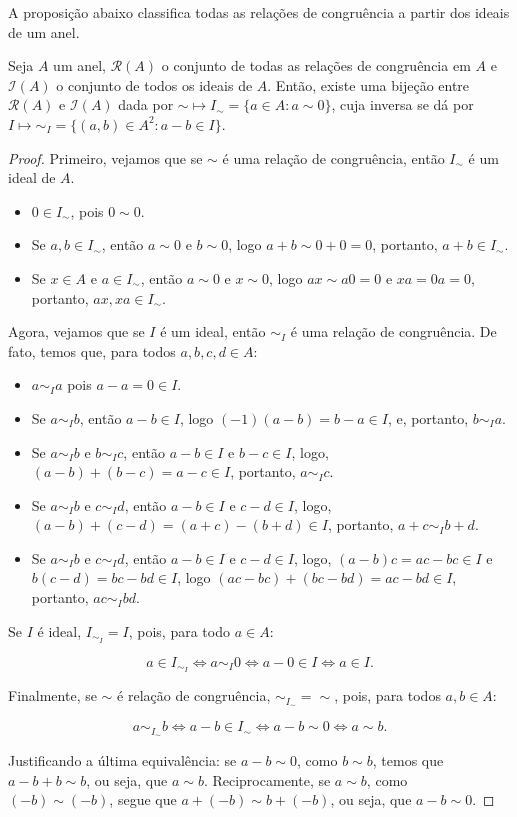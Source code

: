 A proposição abaixo classifica todas as relações de congruência a partir dos ideais de um anel.
\begin{prop}
    Seja $A$ um anel, $\mathcal R(A)$ o conjunto de todas as relações de congruência em $A$ e $\mathcal I(A)$ o conjunto de todos os ideais de $A$. Então, existe uma bijeção entre $\mathcal R(A)$ e $\mathcal I(A)$ dada por
    $\sim \mapsto I_{\sim}=\{a \in A: a\sim 0\}$,
    cuja inversa se dá por $I\mapsto \sim_I=\{(a, b) \in A^2: a-b \in I\}$.
\end{prop}
\begin{proof}
Primeiro, vejamos que se $\sim$ é uma relação de congruência, então $I_\sim$ é um ideal de $A$.

\begin{itemize}
\item $0 \in I_\sim$, pois $0\sim 0$.
\item Se $a, b \in I_\sim$, então $a\sim 0$ e $b\sim 0$, logo $a+b\sim 0+0=0$, portanto, $a+b \in I_\sim$.
\item Se $x \in A$ e $a \in I_\sim$, então $a\sim 0$ e $x\sim 0$, logo $ax\sim a0=0$ e $xa=0a=0$, portanto, $ax, xa \in I_\sim$.
\end{itemize}

Agora, vejamos que se $I$ é um ideal, então $\sim_I$ é uma relação de congruência. De fato, temos que, para todos $a, b, c, d \in A$:
\begin{itemize}
    \item $a\sim_I a$ pois $a-a=0\in I$.
    \item Se $a\sim_I b$, então $a-b \in I$, logo $(-1)(a-b)=b-a\in I$, e, portanto, $b\sim_I a$.
    \item Se $a\sim_I b$ e $b\sim_I c$, então $a-b \in I$ e $b-c \in I$, logo, $(a-b)+(b-c)=a-c \in I$, portanto, $a\sim_I c$.
    \item Se $a\sim_I b$ e $c\sim_I d$, então $a-b \in I$ e $c-d \in I$, logo, $(a-b)+(c-d)=(a+c)-(b+d)\in I$, portanto, $a+c\sim_I b+d$.
    \item Se $a\sim_I b$ e $c\sim_I d$, então $a-b \in I$ e $c-d \in I$, logo, $(a-b)c=ac-bc\in I$ e $b(c-d)=bc-bd\in I$, logo $(ac-bc)+(bc-bd)=ac-bd\in I$, portanto, $ac\sim_I bd$.
    \end{itemize}

Se $I$ é ideal, $I_{\sim_I}=I$, pois, para todo $a\in A$:

$$a\in I_{\sim_I}\Leftrightarrow a\sim_I 0\Leftrightarrow a-0\in I\Leftrightarrow a\in I.$$

Finalmente, se $\sim$ é relação de congruência, $\sim_{I_\sim}=\sim$, pois, para todos $a, b \in A$:

$$a\sim_{I_\sim} b\Leftrightarrow a-b\in I_\sim \Leftrightarrow a-b\sim 0\Leftrightarrow a\sim b.$$

Justificando a última equivalência: se $a-b\sim 0$, como $b\sim b$, temos que $a-b+b\sim b$, ou seja, que $a\sim b$. Reciprocamente, se $a\sim b$, como $(-b)\sim (-b)$, segue que $a+(-b)\sim b+(-b)$, ou seja, que $a-b\sim 0$.
\end{proof}

